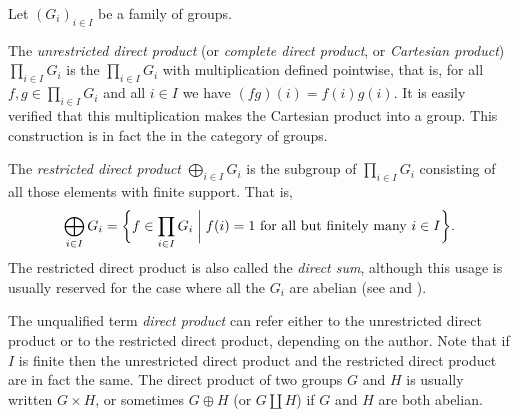 \documentclass[12pt]{article}
\begin{document}

Let $(G_i)_{i\in I}$ be a family of groups.

The \emph{unrestricted direct product}
(or \emph{complete direct product}, or \emph{Cartesian product})
$\prod_{i\in I}G_i$
is the 
$\prod_{i\in I}G_i$ with multiplication defined pointwise,
that is, for all $f,g\in\prod_{i\in I}G_i$ and all $i\in I$
we have $(fg)(i)=f(i)g(i)$.
It is easily verified that this multiplication
makes the Cartesian product into a group.
This construction is in fact the  in the category of groups.

The \emph{restricted direct product} $\bigoplus_{i\in I}G_i$ is the subgroup of $\prod_{i\in I}G_i$ consisting of all those elements with finite support. That is, 
\[\bigoplus_{i\in I}G_i=\biggl\{f\in\prod_{i\in I}G_i\biggm| f(i)=1\hbox{ for all but finitely many }i\in I\biggr\}.\]
The restricted direct product is also called the \emph{direct sum}, although this usage is usually reserved for the case where all the $G_i$ are abelian (see  and ).

The unqualified term \emph{direct product} can refer either to the unrestricted direct product or to the restricted direct product, depending on the author.
Note that if $I$ is finite then the unrestricted direct product and the restricted direct product are in fact the same.
The direct product of two groups $G$ and $H$ is usually written $G\times H$,
or sometimes $G\oplus H$ (or $G\coprod H$) if $G$ and $H$ are both abelian.
\end{document}
